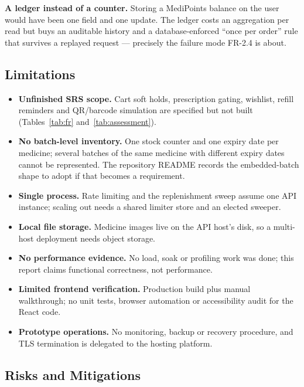 \documentclass[11pt,a4paper]{article}
\begin{document}
\textbf{A ledger instead of a counter.} Storing a MediPoints balance on the user would
have been one field and one update. The ledger costs an aggregation per read but buys an
auditable history and a database-enforced ``once per order'' rule that survives a
replayed request --- precisely the failure mode FR-2.4 is about.

\subsection{Limitations}
\begin{itemize}[leftmargin=1.2em,itemsep=1pt,topsep=2pt]
  \item \textbf{Unfinished SRS scope.} Cart soft holds, prescription gating, wishlist, refill reminders and QR/barcode simulation are specified but not built (Tables~\ref{tab:fr} and~\ref{tab:assessment}).
  \item \textbf{No batch-level inventory.} One stock counter and one expiry date per medicine; several batches of the same medicine with different expiry dates cannot be represented. The repository README records the embedded-batch shape to adopt if that becomes a requirement.
  \item \textbf{Single process.} Rate limiting and the replenishment sweep assume one API instance; scaling out needs a shared limiter store and an elected sweeper.
  \item \textbf{Local file storage.} Medicine images live on the API host's disk, so a multi-host deployment needs object storage.
  \item \textbf{No performance evidence.} No load, soak or profiling work was done; this report claims functional correctness, not performance.
  \item \textbf{Limited frontend verification.} Production build plus manual walkthrough; no unit tests, browser automation or accessibility audit for the React code.
  \item \textbf{Prototype operations.} No monitoring, backup or recovery procedure, and TLS termination is delegated to the hosting platform.
\end{itemize}

\subsection{Risks and Mitigations}
\end{document}
